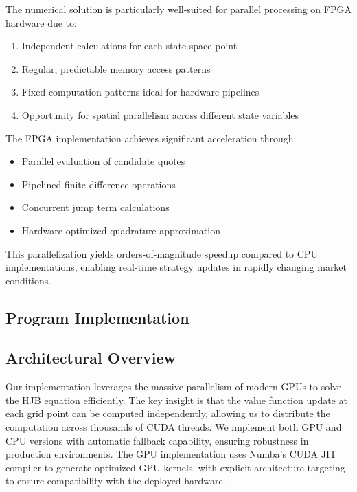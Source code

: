 \documentclass[twocolumn,ieee]{arithmaxresearch}
\begin{document}
\begin{onecolumn}
The numerical solution is particularly well-suited for parallel processing on FPGA hardware due to:

\begin{enumerate}
    \item Independent calculations for each state-space point
    \item Regular, predictable memory access patterns 
    \item Fixed computation patterns ideal for hardware pipelines
    \item Opportunity for spatial parallelism across different state variables
\end{enumerate}

The FPGA implementation achieves significant acceleration through:
\begin{itemize}
    \item Parallel evaluation of candidate quotes
    \item Pipelined finite difference operations
    \item Concurrent jump term calculations
    \item Hardware-optimized quadrature approximation
\end{itemize}

This parallelization yields orders-of-magnitude speedup compared to CPU implementations, enabling real-time strategy updates in rapidly changing market conditions.
\begin{onecolumn}
    
\section{Program Implementation}
\subsection{Architectural Overview}

Our implementation leverages the massive parallelism of modern GPUs to solve the HJB equation efficiently. The key insight is that the value function update at each grid point can be computed independently, allowing us to distribute the computation across thousands of CUDA threads. We implement both GPU and CPU versions with automatic fallback capability, ensuring robustness in production environments. The GPU implementation uses Numba's CUDA JIT compiler to generate optimized GPU kernels, with explicit architecture targeting to ensure compatibility with the deployed hardware.


\end{onecolumn}
\end{onecolumn}
\end{document}
